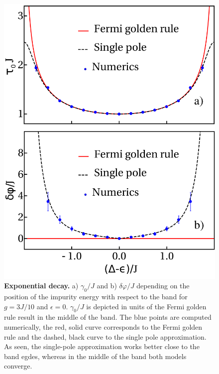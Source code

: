 \documentclass[aps,pra,twocolumn,floatfix,superscriptaddress]{revtex4-1}%
\begin{document}
\begin{figure}[thb!]
\includegraphics[width=1.0\columnwidth]{gamma_phi_g_0_3.pdf}
\caption{{\bf Exponential decay.} a) $\gamma_0/J$ and b) $\delta\varphi/J$ depending on the position of the impurity energy with respect to the band for $g=3J/10$ and $\epsilon=0$. $\gamma_0/J$ is depicted in units of the Fermi golden rule result in the middle of the band. The blue points are computed numerically, the red, solid curve corresponds to the Fermi golden rule and the dashed, black curve to the single pole approximation. As seen, the single-pole approximation works better close to the band egdes, whereas in the middle of the band both models converge.}\label{fig:qubit_decay}
\end{figure}
\end{document}
